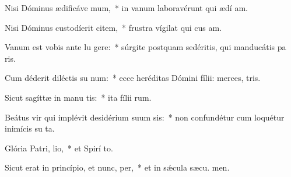 \item Nisi Dóminus ædificáve mum,~* in vanum laboravérunt qui ædí am.
\item Nisi Dóminus custodíerit citem,~* frustra vígilat qui cus am.
\item Vanum est vobis ante lu gere:~* súrgite postquam sedéritis, qui manducátis pa ris.
\item Cum déderit diléctis su num:~* ecce heréditas Dómini fílii: merces,  tris.
\item Sicut sagíttæ in manu tis:~* ita fílii rum.
\item Beátus vir qui implévit desidérium suum  sis:~* non confundétur cum loquétur inimícis su  ta.
\item Glória Patri,  lio,~* et Spirí to.
\item Sicut erat in princípio, et nunc,  per,~* et in sǽcula sæcu. men.

